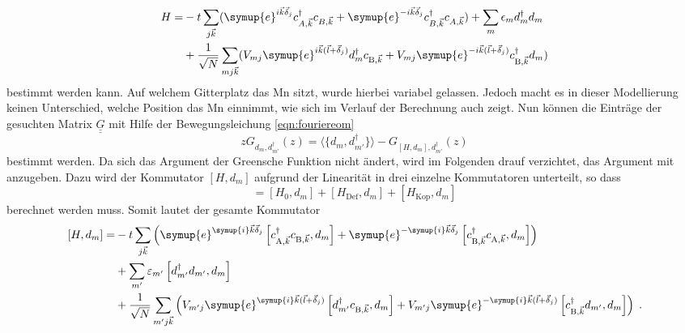 \begin{equation*}
    \begin{split}
        H = &-t \sum_{j \vec{k}} ( \symup{e}^{i\vec{k}\vec{\delta}_j}c^\dagger_{A,\vec{k}} c_{B,\vec{k}} + 
            \symup{e}^{-i\vec{k}\vec{\delta}_j} c^\dagger_{B,\vec{k}}c_{A,\vec{k}}) + \sum_m \epsilon_m d_m^\dagger d_m \\
            &+ \frac{1}{\sqrt{N}}\sum_{mj\vec{k}} ( V_{mj}  \symup{e}^{i\vec{k}(\vec{l}+\vec{\delta}_j)} d_m^\dagger c_{\text{B},\vec{k}} 
            + V_{mj} \symup{e}^{-i\vec{k}(\vec{l}+\vec{\delta}_j)}c^\dagger_{\text{B},\vec{k}} d_m )
    \end{split}
\end{equation*}
bestimmt werden kann.
Auf welchem Gitterplatz das Mn sitzt, wurde hierbei variabel gelassen.
Jedoch macht es in dieser Modellierung keinen Unterschied, welche Position das Mn einnimmt, wie sich im Verlauf der Berechnung auch zeigt.
Nun können die Einträge der gesuchten Matrix $\underline{\underline{G}}$ mit Hilfe der Bewegungsleichung \eqref{eqn:fouriereom} 
\begin{equation}
    zG_{d_m, d_{m'}^\dagger}(z) = \langle \{ d_m, d_{m'}^\dagger \} \rangle - G_{[H,d_m], d_{m'}^\dagger} (z) \label{eqn:eomgreenansatz}
\end{equation}
bestimmt werden.
Da sich das Argument der Greensche Funktion nicht ändert, wird im Folgenden drauf verzichtet, das Argument mit anzugeben.
Dazu wird der Kommutator $[H,d_m]$ aufgrund der Linearität in drei einzelne Kommutatoren unterteilt, so dass
\begin{equation*}
    [H,d_m] = [H_0,d_m] + [H_\text{Def},d_m] +[H_\text{Kop},d_m] 
\end{equation*}
berechnet werden muss.
Somit lautet der gesamte Kommutator
\begin{equation}
    \begin{split}
    [H, d_m] = &-t \sum_{j\vec{k}} \left ( \symup{e}^{\symup{i}\vec{k} \vec{\delta}_j}      \left [ c^\dagger_{\text{A},\vec{k}}  
        c_{\text{B},\vec{k}}, d_m \right ] + \symup{e}^{-\symup{i}\vec{k} \vec{\delta}_j}   \left [ c^\dagger_{\text{B},\vec{k}}  
        c_{\text{A},\vec{k}}, d_m \right ]  \right ) \\
        &+\sum_{m'} \varepsilon_{m'} \left [ d^\dagger_{m'} d_{m'}, d_{m} \right ] \\
        &+ \frac{1}{\sqrt{N}} \sum_{m'j\vec{k}} \left ( V_{m'j} \symup{e}^{\symup{i}\vec{k} (\vec{l} + \vec{\delta}_j)}   
        \left [d^\dagger_{m'}c_{\text{B}, \vec{k}}, d_m \right ]
        +  V_{m'j} \symup{e}^{-\symup{i}\vec{k} (\vec{l} + \vec{\delta}_j)}   
        \left [c^\dagger_{\text{B},\vec{k}} d_{m'},  d_m \right ]
        \right ) \; . \label{eqn:commutator_H_dm}
    \end{split}
\end{equation} 
